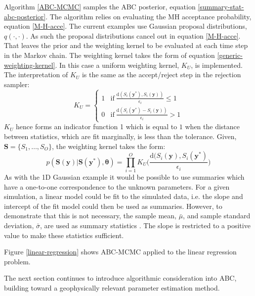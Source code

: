 Algorithm \ref{ABC-MCMC} samples the ABC posterior, equation \ref{summary-stat-abc-posterior}. The algorithm relies on evaluating the MH acceptance probability, equation \ref{M-H-acce}. The current examples use Gaussian proposal distributions, $q(\cdot,\cdot)$. As such the proposal distributions cancel out in equation \ref{M-H-acce}. That leaves the prior and the weighting kernel to be evaluated at each time step in the Markov chain. The weighting kernel takes the form of equation \ref{generic-weighting-kernel}. In this case a uniform weighting kernel, $K_U$, is implemented. The interpretation of $K_U$ is the same as the accept/reject step in the rejection sampler: 
\begin{equation}
	K_U = 
	\begin{cases}
		1 & \text{if}\ 	\frac{\text{d}(S_i(\bm{y^*}),S_i(\bm{y}))}				{\epsilon_i} \leq 1\\
		0 & \text{if}\ \frac{\text{d}(S_i(\bm{y^*}) - S_i(\bm{y}))}				{\epsilon_i} > 1
	\end{cases}
\end{equation}
$K_U$ hence forms an indicator function 1 which is equal to $1$ when the distance between statistics, which are fit marginally, is less than the tolerance. Given, $\bm{S} = \{S_1,\dots,S_O\}$, the weighting kernel takes the form:
\begin{equation}
	p(\bm{S}(\bm{y})|\bm{S}(\bm{y^*}),\bm{\theta}) = \prod_{i = 1}^{O} K_U\Big(\frac{\text{d}(S_i(\bm{y}),S_i(\bm{y^*})}{\epsilon_i}\Big)
	\label{weight-kernel}
\end{equation}
As with the 1D Gaussian example it would be possible to use summaries which have a one-to-one correspondence to the unknown parameters. For a given simulation, a linear model could be fit to the simulated data, i.e. the slope and intercept of the fit model could then be used as summaries. However, to demonstrate that this is not necessary, the sample mean, $\bar{\mu}$, and sample standard deviation, $\bar{\sigma}$, are used as summary statistics \citep{vrugt2013toward}. The slope is restricted to a positive value to make these statistics sufficient. \par

Figure \ref{linear-regression} shows ABC-MCMC applied to the linear regression problem. \par

The next section continues to introduce algorithmic consideration into ABC, building toward a geophysically relevant parameter estimation method.\par

